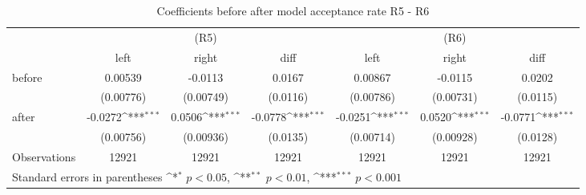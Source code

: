 \begin{table}[!ht]\centering \footnotesize
\def\sym#1{\ifmmode^{#1}\else\(^{#1}\)\fi}
\caption{Coefficients before after model acceptance rate R5 - R6}
\begin{tabular}{l*{6}{c}}
\hline\hline
                    &\multicolumn{3}{c}{(R5)}&\multicolumn{3}{c}{(R6)}\\
&\multicolumn{1}{c}{left}&\multicolumn{1}{c}{right}&\multicolumn{1}{c}{diff}&\multicolumn{1}{c}{left}&\multicolumn{1}{c}{right}&\multicolumn{1}{c}{diff}\\
\hline
before              &     0.00539         &     -0.0113         &      0.0167         &     0.00867         &     -0.0115         &      0.0202         \\
                    &   (0.00776)         &   (0.00749)         &    (0.0116)         &   (0.00786)         &   (0.00731)         &    (0.0115)         \\
[0,5em]
after               &     -0.0272\sym{***}&      0.0506\sym{***}&     -0.0778\sym{***}&     -0.0251\sym{***}&      0.0520\sym{***}&     -0.0771\sym{***}\\
                    &   (0.00756)         &   (0.00936)         &    (0.0135)         &   (0.00714)         &   (0.00928)         &    (0.0128)         \\
\hline
Observations        &       12921         &       12921         &       12921         &       12921         &       12921         &       12921         \\
\hline\hline
\multicolumn{7}{l}{\footnotesize Standard errors in parentheses \sym{*} \(p<0.05\), \sym{**} \(p<0.01\), \sym{***} \(p<0.001\)}\\
\end{tabular}
\end{table}
